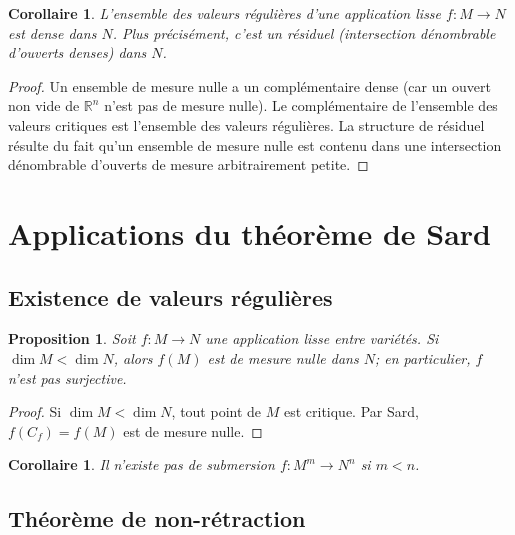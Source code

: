 \documentclass[12pt,a4paper,openany]{book}
\theoremstyle{definition}
\theoremstyle{plain}
\newtheorem{proposition}[definition]{Proposition}
\newtheorem{corollaire}[definition]{Corollaire}
\theoremstyle{remark}
\newcommand{\R}{\mathbb{R}}
\begin{document}
\begin{corollaire}\label{cor:valeurs-regulieres-denses}
L'ensemble des valeurs régulières d'une application lisse $f \colon M \to N$
est dense dans $N$. Plus précisément, c'est un résiduel (intersection
dénombrable d'ouverts denses) dans $N$.
\end{corollaire}

\begin{proof}
Un ensemble de mesure nulle a un complémentaire dense (car un ouvert non vide
de $\R^n$ n'est pas de mesure nulle). Le complémentaire de l'ensemble des
valeurs critiques est l'ensemble des valeurs régulières. La structure de
résiduel résulte du fait qu'un ensemble de mesure nulle est contenu dans une
intersection dénombrable d'ouverts de mesure arbitrairement petite.
\end{proof}

\section{Applications du théorème de Sard}\label{sec:sard-applications}

\subsection{Existence de valeurs régulières}\label{ssec:existence-val-reg}

\begin{proposition}\label{prop:existence-val-reg}
Soit $f \colon M \to N$ une application lisse entre variétés. Si $\dim M < \dim N$,
alors $f(M)$ est de mesure nulle dans $N$; en particulier, $f$ n'est pas
surjective.
\end{proposition}

\begin{proof}
Si $\dim M < \dim N$, tout point de $M$ est critique. Par Sard, $f(C_f) = f(M)$
est de mesure nulle.
\end{proof}

\begin{corollaire}\label{cor:pas-immersion-dim}
Il n'existe pas de submersion $f \colon M^m \to N^n$ si $m < n$.
\end{corollaire}

\subsection{Théorème de non-rétraction}\label{ssec:non-retraction}
\end{document}
